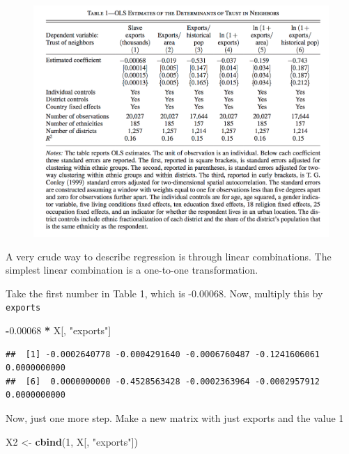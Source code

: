 \documentclass[]{book}
\newenvironment{Shaded}{\begin{snugshade}}{\end{snugshade}}
\newcommand{\KeywordTok}[1]{\textcolor[rgb]{0.13,0.29,0.53}{\textbf{#1}}}
\newcommand{\DecValTok}[1]{\textcolor[rgb]{0.00,0.00,0.81}{#1}}
\newcommand{\FloatTok}[1]{\textcolor[rgb]{0.00,0.00,0.81}{#1}}
\newcommand{\StringTok}[1]{\textcolor[rgb]{0.31,0.60,0.02}{#1}}
\newcommand{\OperatorTok}[1]{\textcolor[rgb]{0.81,0.36,0.00}{\textbf{#1}}}
\newcommand{\NormalTok}[1]{#1}
\theoremstyle{definition}
\theoremstyle{definition}
\theoremstyle{definition}
\theoremstyle{remark}
\begin{document}
\begin{figure}
\centering
\includegraphics{images/nunn_wantchekon_table1.png}
\caption{}
\end{figure}

A very crude way to describe regression is through linear combinations.
The simplest linear combination is a one-to-one transformation.

Take the first number in Table 1, which is -0.00068. Now, multiply this
by \texttt{exports}

\begin{Shaded}
\begin{Highlighting}[]
\OperatorTok{-}\FloatTok{0.00068} \OperatorTok{*}\StringTok{ }\NormalTok{X[, }\StringTok{"exports"}\NormalTok{]}
\end{Highlighting}
\end{Shaded}

\begin{verbatim}
##  [1] -0.0002640778 -0.0004291640 -0.0006760487 -0.1241606061  0.0000000000
##  [6]  0.0000000000 -0.4528563428 -0.0002363964 -0.0002957912  0.0000000000
\end{verbatim}

Now, just one more step. Make a new matrix with just exports and the
value 1

\begin{Shaded}
\begin{Highlighting}[]
\NormalTok{X2 <-}\StringTok{ }\KeywordTok{cbind}\NormalTok{(}\DecValTok{1}\NormalTok{, X[, }\StringTok{"exports"}\NormalTok{])}
\end{Highlighting}
\end{Shaded}
\end{document}
